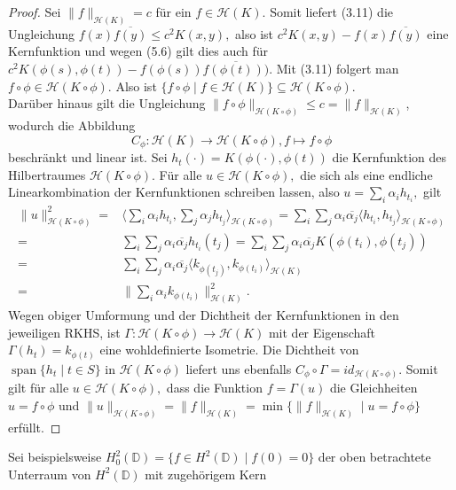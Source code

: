 \documentclass[12pt,titlepage,twoside,cleardoublepage]{article}
\theoremstyle{nummermitklammern}
\numberwithin{equation}{section}
\DeclareMathOperator{\Span}{span}
\begin{document}
\begin{proof}
Sei $\|f\|_{\mathcal{H}(K)}=c$ für ein $f \in \mathcal{H}(K).$ Somit liefert (3.11) die Ungleichung $f(x)\overline{f(y)}\leq c^2K(x,y),$ also ist $c^2K(x,y)-f(x)\overline{f(y)}$ eine Kernfunktion und wegen (5.6) gilt dies auch für $c^2K(\phi(s),\phi(t))-f(\phi(s))\overline{f(\phi(t)))}.$ Mit (3.11) folgert man $f\circ \phi \in \mathcal{H}(K\circ \phi).$ Also ist $\{f\circ \phi\mid f\in \mathcal{H}(K)\}\subseteq \mathcal{H}(K\circ \phi).$\\
Darüber hinaus gilt die Ungleichung $\|f\circ \phi\|_{\mathcal{H}(K\circ \phi)}\leq c=\|f\|_{\mathcal{H}(K)}$, wodurch  die Abbildung 
\[
C_{\phi}:\mathcal{H}(K)\to \mathcal{H}(K\circ \phi),f\mapsto f\circ \phi
\] beschränkt und linear ist.
 Sei $h_t(\cdot)=K(\phi(\cdot),\phi(t))$ die Kernfunktion des Hilbertraumes $\mathcal{H}(K\circ \phi).$ Für alle $u\in \mathcal{H}(K\circ \phi),$ die sich als eine endliche Linearkombination der Kernfunktionen schreiben lassen, also $u=\sum_i \alpha_i h_{t_i},$ gilt 
\begin{align*}
\|u\|^2_{\mathcal{H}(K\circ \phi)}=&
\langle \sum_i\alpha_ih_{t_i},\sum_j\alpha_jh_{t_j} \rangle_{\mathcal{H}(K\circ \phi )}=
 \sum_i\sum_j\alpha_i\overline{\alpha_j}\langle h_{t_i},h_{t_j} \rangle_{\mathcal{H}(K\circ \phi )}\\
 =& \sum_i\sum_j\alpha_i\overline{\alpha_j} h_{t_i}(t_j)
 = \sum_i\sum_j\alpha_i\overline{\alpha_j} K(\phi(t_i),\phi(t_j))\\
=&\sum_i\sum_j\alpha_i\overline{\alpha_j}\langle k_{\phi(t_j)},{k_{\phi(t_i)}} \rangle_{\mathcal{H}(K )}\\
=&\|\sum_i\alpha_ik_{\phi(t_i)}\|^2_{\mathcal{H}(K)}.
\end{align*}
Wegen obiger Umformung und der Dichtheit der Kernfunktionen in den jeweiligen RKHS, ist $\Gamma:\mathcal{H}(K\circ \phi )\to \mathcal{H}(K)$ mit der Eigenschaft $\Gamma(h_t)=k_{\phi(t)}$ eine wohldefinierte Isometrie.
 Die Dichtheit von $\Span\{h_t\mid t\in S\}$ in $\mathcal{H}(K \circ \phi)$ liefert uns ebenfalls 
  $C_{\phi}\circ \Gamma =id_{\mathcal{H}(K \circ \phi)}.$ Somit gilt für alle $u\in \mathcal{H}(K\circ \phi),$ dass die Funktion $f=\Gamma (u)$ die Gleichheiten $u=f\circ \phi $ und $\|u\|_{\mathcal{H}(K\circ \phi)}=\|f\|_{\mathcal{H}(K)}=\min\{\|f\|_{\mathcal{H}(K)}\mid u=f\circ \phi\}$ erfüllt.
\end{proof}
Sei beispielsweise $H^2_0(\mathbb{D})=\{f\in H^2(\mathbb{D})\mid f(0)=0\}$ der oben betrachtete Unterraum von $H^2(\mathbb{D})$ mit zugehörigem Kern
\end{document}
